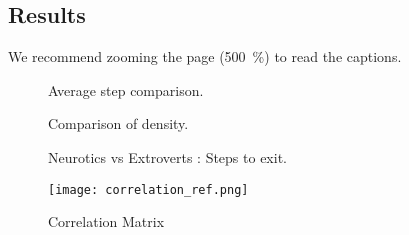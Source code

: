 \documentclass[12pt]{article}
\begin{document}
\begin{spacing}{1.15}
\section{Results}
We recommend zooming the page (500~\%) to read the captions.
\begin{figure}[h!]
    \centering
    \begin{minipage}{0.45\textwidth}
        \centering
        \hfill
        \caption{Average step comparison.}
        \label{fig:comparison1}
    \end{minipage}
    \hfill
    \begin{minipage}{0.45\textwidth}
        \centering
        \hfill
        \caption{Comparison of density.}
        \label{fig:comparison2}
    \end{minipage}
\end{figure}

\begin{figure}[h!]
    \centering
    \begin{minipage}{0.45\textwidth}
        \centering
        \hfill
        \caption{Neurotics vs Extroverts : Steps to exit.}
        \label{fig:comparison3}
    \end{minipage}
    \hfill
        \begin{minipage}{0.45\textwidth}
        \centering
        \texttt{[image: correlation\_ref.png]}
        \caption{Correlation Matrix}
        \label{fig:image4}
    \end{minipage}


\end{figure}
\end{spacing}
\end{document}
